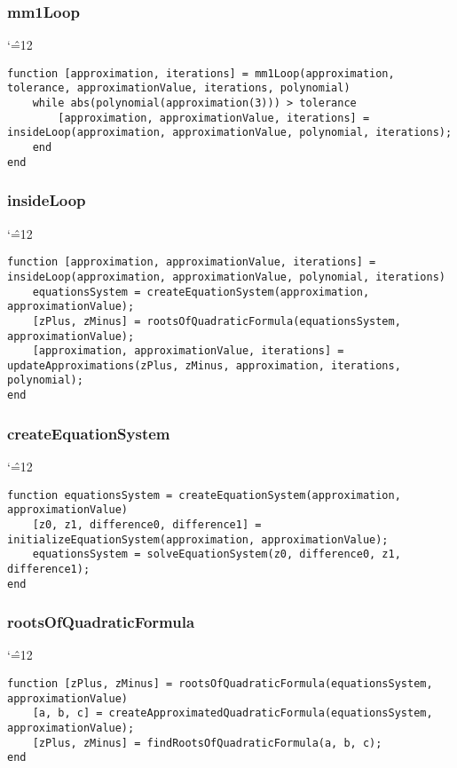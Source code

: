\documentclass[12pt]{report}
\newenvironment{simplechar}{%
   \catcode`\^=12
}{}
\begin{document}
\subsubsection{mm1Loop}
\begin{simplechar}
\begin{lstlisting}
function [approximation, iterations] = mm1Loop(approximation, tolerance, approximationValue, iterations, polynomial)
    while abs(polynomial(approximation(3))) > tolerance
        [approximation, approximationValue, iterations] = insideLoop(approximation, approximationValue, polynomial, iterations);
    end
end
\end{lstlisting}
\end{simplechar}

\subsubsection{insideLoop}
\begin{simplechar}
\begin{lstlisting}
function [approximation, approximationValue, iterations] = insideLoop(approximation, approximationValue, polynomial, iterations)
    equationsSystem = createEquationSystem(approximation, approximationValue);
    [zPlus, zMinus] = rootsOfQuadraticFormula(equationsSystem, approximationValue);
    [approximation, approximationValue, iterations] = updateApproximations(zPlus, zMinus, approximation, iterations, polynomial);
end
\end{lstlisting}
\end{simplechar}

\subsubsection{createEquationSystem}
\begin{simplechar}
\begin{lstlisting}
function equationsSystem = createEquationSystem(approximation, approximationValue)
    [z0, z1, difference0, difference1] = initializeEquationSystem(approximation, approximationValue);
    equationsSystem = solveEquationSystem(z0, difference0, z1, difference1);
end
\end{lstlisting}
\end{simplechar}

\subsubsection{rootsOfQuadraticFormula}
\begin{simplechar}
\begin{lstlisting}
function [zPlus, zMinus] = rootsOfQuadraticFormula(equationsSystem, approximationValue)
    [a, b, c] = createApproximatedQuadraticFormula(equationsSystem, approximationValue);
    [zPlus, zMinus] = findRootsOfQuadraticFormula(a, b, c);
end
\end{lstlisting}
\end{simplechar}
\end{document}

